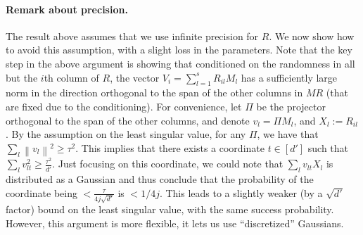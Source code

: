 \documentclass[11pt]{article}
\newcommand{\norm}[1]{\left\lVert#1\right\rVert}
\theoremstyle{plain}
\theoremstyle{plain}
\theoremstyle{definition}
\theoremstyle{plain}
\theoremstyle{remark}
\begin{document}
\paragraph{Remark about precision.} The result above assumes that we use infinite precision for $R$. We now show how to avoid this assumption, with a slight loss in the parameters. 
Note that the key step in the above argument is showing that conditioned on the randomness in all but the $i$th column of $R$, the vector $V_i = \sum_{l=1}^s R_{il} M_l$ has a sufficiently large norm in the direction orthogonal to the span of the other columns in $MR$ (that are fixed due to the conditioning). For convenience, let $\Pi$ be the projector orthogonal to the span of the other columns, and denote $v_l = \Pi M_l$, and $X_{l} := R_{il}$. By the assumption on the least singular value, for any $\Pi$, we have that $\sum_l \norm{v_l}^2 \ge \tau^2$. This implies that there exists a coordinate $t \in [d']$ such that $\sum_l v_{lt}^2 \ge \frac{\tau^2}{d'}$. Just focusing on this coordinate, we could note that $\sum_l v_{lt} X_l$ is distributed as a Gaussian and thus conclude that the probability of the coordinate being $ < \frac{\tau}{4 j \sqrt{d'}}$ is $< 1/4j$. This leads to a slightly weaker (by a $\sqrt{d'}$ factor) bound on the least singular value, with the same success probability. However, this argument is more flexible, it lets us use ``discretized'' Gaussians.
\end{document}
